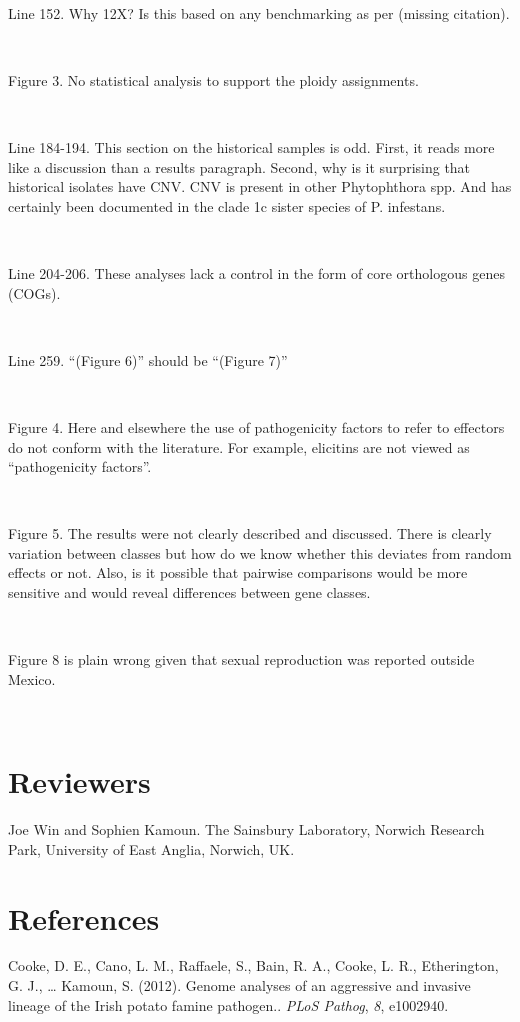 \documentclass[10pt]{article}
\begin{document}
~

Line 152. Why 12X? Is this based on any benchmarking as per
(missing citation).

~

Figure 3. No statistical analysis to support the ploidy assignments.

~

Line 184-194. This section on the historical samples is odd. First, it
reads more like a discussion than a results paragraph. Second, why is it
surprising that historical isolates have CNV. CNV is present in other
Phytophthora spp. And has certainly been documented in the clade 1c
sister species of P. infestans.

~

Line 204-206. These analyses lack a control in the form of core
orthologous genes (COGs).

~

Line 259. ``(Figure 6)'' should be ``(Figure 7)''

~

Figure 4. Here and elsewhere the use of pathogenicity factors to refer
to effectors do not conform with the literature. For example, elicitins
are not viewed as ``pathogenicity factors''.

~

Figure 5. The results were not clearly described and discussed. There is
clearly variation between classes but how do we know whether this
deviates from random effects or not. Also, is it possible that pairwise
comparisons would be more sensitive and would reveal differences between
gene classes.

~

Figure 8 is plain wrong given that sexual reproduction was reported
outside Mexico.

~

\section*{Reviewers}

{\label{914254}}

Joe Win and Sophien Kamoun. The Sainsbury Laboratory, Norwich Research
Park, University of East Anglia, Norwich, UK.

\FloatBarrier
\section*{References}\sloppy
{}
\label{csl:3}Cooke, D. E., Cano, L. M., Raffaele, S., Bain, R. A., Cooke, L. R., Etherington, G. J., … Kamoun, S. (2012). {Genome analyses of an aggressive and invasive lineage of the Irish potato famine pathogen.}. \textit{PLoS Pathog}, \textit{8}, e1002940.
\end{document}
